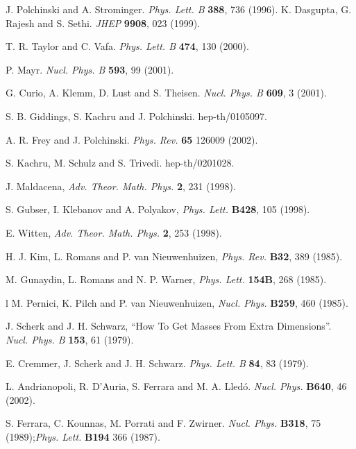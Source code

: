 \documentclass[a4paper,12pt]{article}
\begin{document}
\begin{thebibliography}{99}

J. Polchinski and A. Strominger. {\it Phys.  Lett.  B} {\bf 388}, 736 (1996).
K. Dasgupta, G. Rajesh and S. Sethi. {\it JHEP} {\bf 9908}, 023 (1999).

T. R. Taylor and C. Vafa. {\it Phys. Lett. B} {\bf 474}, 130
(2000).


P. Mayr. {\it Nucl.  Phys.  B} {\bf 593}, 99
(2001).

G. Curio, A. Klemm, D. Lust and S. Theisen. {\it Nucl. Phys. B} {\bf 609}, 3 (2001).


 S. B. Giddings, S. Kachru and J. Polchinski.
hep-th/0105097.

A. R. Frey and J. Polchinski. {\it Phys. Rev.}  {\bf 65} 126009 (2002).


S. Kachru, M. Schulz and S. Trivedi.
 hep-th/0201028.
 
  J. Maldacena, {\it Adv. Theor. Math. Phys.} {\bf 2}, 231 (1998).
 
  S. Gubser, I. Klebanov and A. Polyakov, {\it  Phys. Lett. } {\bf B428}, 105 (1998).
 
  E. Witten, {\it Adv. Theor. Math. Phys.} {\bf 2}, 253 (1998).
 
 
 
 
 
  H. J. Kim, L. Romans and P. van Nieuwenhuizen, {\it  Phys. Rev.} {\bf B32}, 389 (1985).
 
  M. Gunaydin, L. Romans and N. P. Warner, {\it  Phys. Lett. } {\bf 154B}, 268 (1985).
 
 l M. Pernici, K. Pilch and P. van Nieuwenhuizen, {\it  Nucl. Phys. } {\bf B259}, 460 (1985).
 
J. Scherk and J. H. Schwarz, ``How To Get Masses From Extra
Dimensions''. {\it Nucl. Phys. B} {\bf 153}, 61 (1979).
 
 E. Cremmer, J. Scherk and J. H. Schwarz.
{\it Phys. Lett. B} {\bf 84}, 83 (1979).
 
 
 L. Andrianopoli, R. D'Auria, S. Ferrara and M. A. Lled\'o. {\it  Nucl. Phys. } {\bf B640}, 46 
(2002).

 S. Ferrara, C. Kounnas, M. Porrati and F. Zwirner. {\it  Nucl. Phys. } {\bf B318}, 75 
(1989);{\it Phys. Lett. } {\bf B194} 366 (1987).




\end{thebibliography}
\end{document}
